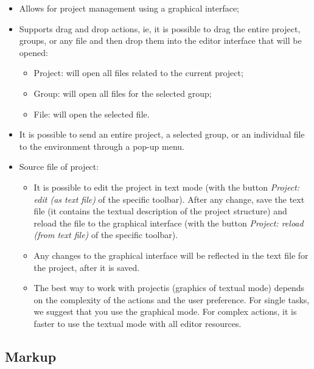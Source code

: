 \begin{itemize}
  \item Allows for project management using a graphical interface;
  \item Supports drag and drop actions, ie, it is possible to drag
    the entire project, groups, or any file and then drop them
    into the editor interface that will be opened:
    \begin{itemize}
      \item Project: will open all files related to the current project;
      \item Group: will open all files for the selected group;
      \item File: will open the selected file.
    \end{itemize}
  \item It is possible to send an entire project,
    a selected group, or an individual file to the \RR{} environment through a pop-up menu.
  \item  Source file of project:
    \begin{itemize}
      \item It is possible to edit the project in text mode (with the button
        \textit{Project: edit (as text file)} of the specific toolbar).
        After any change, save the text file (it contains the textual
        description of the project structure) and reload the file to the
        graphical interface (with the button \textit{Project:
          reload (from text file)} of the specific toolbar).
      \item Any changes to the graphical interface will be reflected in the
        text file for the project, after it is saved.
      \item The best way to work with projectis (graphics of textual mode)
        depends on the complexity of the actions and the user preference.
        For single tasks, we suggest that you use the graphical mode.
        For complex actions, it is faster to use the textual mode with
        all editor resources.
    \end{itemize}
\end{itemize}


\hypertarget{working_tools_markup}{}
\subsection{Markup}


